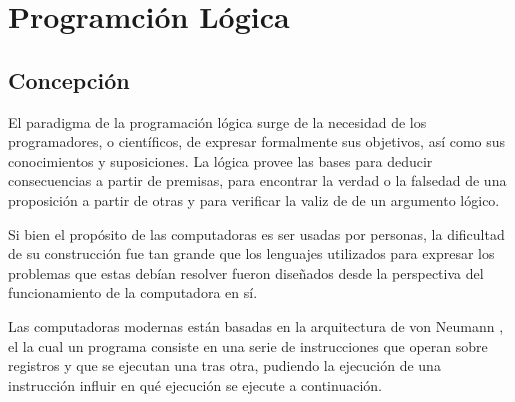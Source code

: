 \documentclass[12pt,titlepage]{article}
\begin{document}

\setcounter{page}{1}

\tableofcontents
\newpage



\clearpage	

\setlength{\parindent}{0pt}
\setlength{\parskip}{2ex plus 0.5ex minus 0.2ex}

\hypersetup{
linkcolor=red
}



\section{Programción Lógica}
\subsection{Concepción}

El paradigma de la programación lógica surge de la necesidad de los programadores, o científicos, de expresar formalmente sus objetivos, así como sus conocimientos y suposiciones. La lógica provee las bases para deducir consecuencias a partir de premisas, para encontrar la verdad o la falsedad de una proposición a partir de otras y para verificar la valiz de de un argumento lógico.

Si bien el propósito de las computadoras es ser usadas por personas, la dificultad de su construcción fue tan grande que los lenguajes utilizados para expresar los problemas que estas debían resolver fueron diseñados desde la perspectiva del funcionamiento de la computadora en sí.

Las computadoras modernas están basadas en la arquitectura de von Neumann \cite{vonneumann}, el la cual un programa consiste en una serie de instrucciones que operan sobre registros y que se ejecutan una tras otra, pudiendo la ejecución de una instrucción influir en qué ejecución se ejecute a continuación.
\end{document}
